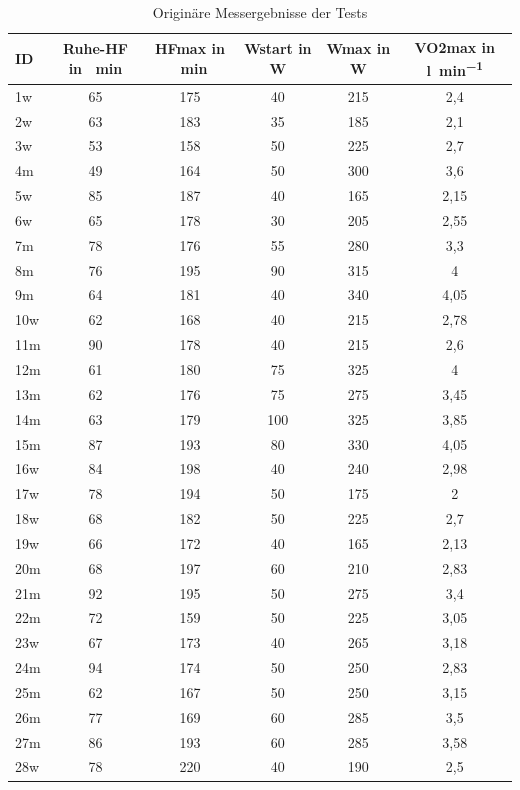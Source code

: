 \begin{table}[H]
	\centering
		\caption{Originäre Messergebnisse der Tests}
		\medskip
		\begin{tabulary}{\textwidth}{L C C C C C}
			\toprule
			ID & Ruhe-\acs{HF} in \si{\per\minute} & \acs{HFmax} in \si{\per\minute} & \acs{Wstart} in \si{\watt} & \acs{Wmax} in \si{\watt} & \acs{VO2max} in \si{\litre\per\minute} \\
			\midrule
			\midrule
			1w & 65 & 175 & 40 & 215 & 2,4 \\
			2w & 63 & 183 & 35 & 185 & 2,1 \\
			3w & 53 & 158 & 50 & 225 & 2,7 \\
			4m & 49 & 164 & 50 & 300 & 3,6 \\
			5w & 85 & 187 & 40 & 165 & 2,15 \\
			6w & 65 & 178 & 30 & 205 & 2,55 \\
			7m & 78 & 176 & 55 & 280 & 3,3 \\
			8m & 76 & 195 & 90 & 315 & 4 \\
			9m & 64 & 181 & 40 & 340 & 4,05 \\
			10w & 62 & 168 & 40 & 215 & 2,78 \\
			11m & 90 & 178 & 40 & 215 & 2,6 \\
			12m & 61 & 180 & 75 & 325 & 4 \\
			13m & 62 & 176 & 75 & 275 & 3,45 \\
			14m & 63 & 179 & 100 & 325 & 3,85 \\
			15m & 87 & 193 & 80 & 330 & 4,05 \\
			16w & 84 & 198 & 40 & 240 & 2,98 \\
			17w & 78 & 194 & 50 & 175 & 2 \\
			18w & 68 & 182 & 50 & 225 & 2,7 \\
			19w & 66 & 172 & 40 & 165 & 2,13 \\
			20m & 68 & 197 & 60 & 210 & 2,83 \\
			21m & 92 & 195 & 50 & 275 & 3,4 \\
			22m & 72 & 159 & 50 & 225 & 3,05 \\
			23w & 67 & 173 & 40 & 265 & 3,18 \\
			24m & 94 & 174 & 50 & 250 & 2,83 \\
			25m & 62 & 167 & 50 & 250 & 3,15 \\
			26m & 77 & 169 & 60 & 285 & 3,5 \\
			27m & 86 & 193 & 60 & 285 & 3,58 \\
			28w & 78 & 220 & 40 & 190 & 2,5 \\
			\bottomrule
		\end{tabulary}
		\label{tab:tabelle4}
\end{table}
%
